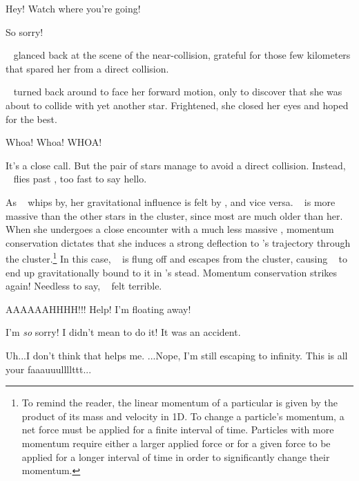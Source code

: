 \documentclass[main.tex]{subfiles}
\begin{document}
\par \Gene Hey!  Watch where you're going!

\par \Sterope So sorry!

\par \nar \rmsterope~ glanced back at the scene of the near-collision, grateful for those few kilometers that spared her from a direct collision.

\par \nar \rmsterope~ turned back around to face her forward motion, only to discover that she was about to collide with yet another star.  Frightened, she closed her eyes and hoped for the best.  

\par \Louise Whoa! Whoa! WHOA!

\par \nar It's a close call.  But the pair of stars manage to avoid a direct collision.  Instead, \rmsterope~ flies past \rmlouise, too fast to say hello.

\par \nar As \rmsterope~ whips by, her gravitational influence is felt by \rmlouise, and vice versa.  \rmsterope~ is more massive than the other stars in the cluster, since most are much older than her.  When she undergoes a close encounter with a much less massive \rmlouise, momentum conservation dictates that she induces a strong deflection to \rmlouise's trajectory through the cluster.\footnote{To remind the reader, the linear momentum of a particular is given by the product of its mass and velocity in 1D.  To change a particle's momentum, a net force must be applied for a finite interval of time.  Particles with more momentum require either a larger applied force or for a given force to be applied for a longer interval of time in order to significantly change their momentum.}  In this case, \rmlouise~ is flung off and escapes from the cluster, causing \rmsterope~ to end up gravitationally bound to it in \rmlouise's stead.  Momentum conservation strikes again!  Needless to say, \rmsterope~ felt terrible.

\par \Louise  AAAAAAHHHH!!! Help!  I'm floating away!

\par \Sterope I'm \textit{so} sorry!  I didn't mean to do it!  It was an accident.  

\par \Louise Uh...I don't think that helps me.  ...Nope, I'm still escaping to infinity.  This is all your faaauuullllttt...
\end{document}
